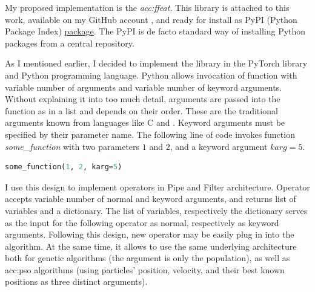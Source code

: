 My proposed implementation is the \emph{\acrfull{acc:ffeat}}. This library is attached to this work, available on my GitHub account \citep{FFEATrepo}, and ready for install as PyPI (Python Package Index) \href{https://pypi.org/project/FFEAT/}{package}. The PyPI is de facto standard way of installing Python packages from a central repository.

As I mentioned earlier, I decided to implement the library in the PyTorch library and Python programming language. Python allows invocation of function with variable number of arguments and variable number of keyword arguments. Without explaining it into too much detail, arguments are passed into the function as in a list and depends on their order. These are the traditional arguments known from languages like C and \cppns. Keyword arguments must be specified by their parameter name. The following line of code invokes function \textit{some\_function} with two parameters $1$ and $2$, and a keyword argument $karg=5$.

\begin{lstlisting}[language=Python]
some_function(1, 2, karg=5)
\end{lstlisting}

I use this design to implement operators in Pipe and Filter architecture. Operator accepts variable number of normal and keyword arguments, and returns list of variables and a dictionary. The list of variables, respectively the dictionary serves as the input for the following operator as normal, respectively as keyword arguments. Following this design, new operator may be easily plug in into the algorithm. At the same time, it allows to use the same underlying architecture both for genetic algorithms (the argument is only the population), as well as \acrshort{acc:pso} algorithms (using particles' position, velocity, and their best known positions as three distinct arguments).

